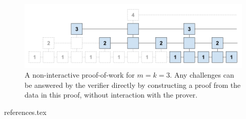 \documentclass[11pt]{llncs}
\begin{document}
\begin{figure}[h]
    \caption{A non-interactive proof-of-work for $m = k = 3$. Any challenges
    can be answered by the verifier directly by constructing a proof from the
    data in this proof, without interaction with the prover.}
    \centering
    \includegraphics[width=\textwidth,keepaspectratio]{figures/non-interactive-popow.png}
\end{figure}

{references.tex}
\end{document}
